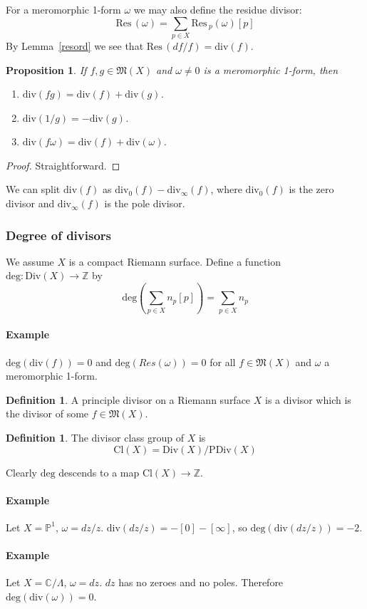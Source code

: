 \documentclass[12pt]{article}
\theoremstyle{plain}
\newtheorem{proposition}[equation]{Proposition}
\theoremstyle{definition}
\newtheorem{definition}[equation]{Definition}
\newcommand{\fM}{\mathfrak{M}}
\newcommand{\IC}{\mathbb{C}}
\newcommand{\IP}{\mathbb{P}}
\newcommand{\IZ}{\mathbb{Z}}
\newcommand{\Res}{\mathrm{Res}\,}
\renewcommand{\deg}{\mathrm{deg}}
\newcommand{\<}{\langle}
\renewcommand{\>}{\rangle}
\newcommand{\w}{\omega}
\newcommand{\Div}{\mathrm{Div}}
\newcommand{\PDiv}{\mathrm{PDiv}}
\renewcommand{\div}{\mathrm{div}}
\newcommand{\Cl}{\mathrm{Cl}}
\begin{document}
For a meromorphic 1-form $\w$ we may also define the residue divisor: 
$$ \Res(\w) = \sum_{p \in X} \Res_p(\w) [p] $$
By Lemma~\ref{resord} we see that $\Res(df/f) = \div(f)$. 

\begin{proposition}
If $f, g \in \fM(X)$ and $\w \neq 0$ is a meromorphic 1-form, then 
\begin{enumerate}
\item $\div(fg) =\div(f) + \div(g)$. 
\item $\div(1/g) = - \div(g)$. 
\item $\div(f\w) = \div(f) + \div(\w)$. 
\end{enumerate}
\end{proposition}
\begin{proof}
Straightforward. 
\end{proof}

We can split $\div(f)$ as $\div_0(f) - \div_\infty (f)$, where $\div_0(f)$ is the zero divisor and $\div_\infty(f)$ is the pole divisor. 

\subsubsection{Degree of divisors}
We assume $X$ is a compact Riemann surface. Define a function $\deg : \Div(X) \to \IZ$ by 
$$ \deg(\sum_{p \in X} n_p [p]) = \sum_{p \in X} n_p $$

\paragraph{Example} $\deg(\div(f)) = 0$ and $\deg(Res(\w)) = 0$ for all $f \in \fM(X)$ and $\w$ a meromorphic 1-form. 

\begin{definition}
A principle divisor on a Riemann surface $X$ is a divisor which is the divisor of some $f \in \fM(X)$. 
\end{definition}
\begin{definition}
The divisor class group of $X$ is 
$$ \Cl(X) = \Div(X)/ \PDiv(X)$$ 
\end{definition}
Clearly $\deg$ descends to a map $\Cl(X) \to \IZ$. 

\paragraph{Example} Let $X = \IP^1$, $\w = dz/z$. 
$ \div(dz/z) = -[0] - [ \infty ]$,
so $\deg(\div(dz/z)) = -2$. 
\paragraph{Example} Let $X = \IC/\Lambda$, $\w = dz$. $dz$ has no zeroes and no poles. Therefore $\deg(\div(\w)) = 0$. 
\end{document}
